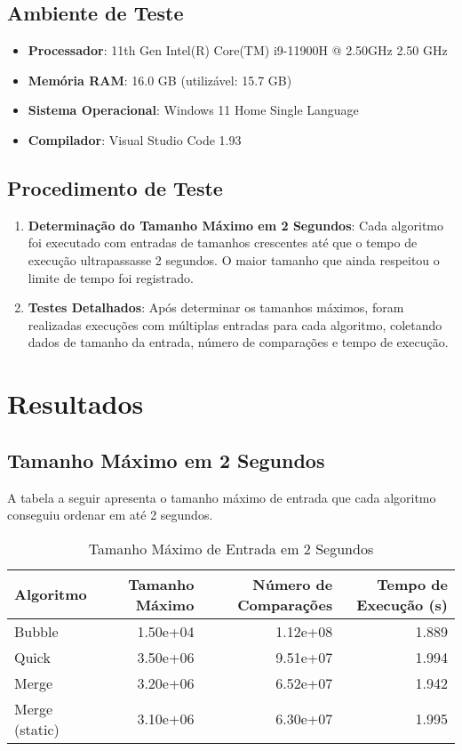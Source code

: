 \documentclass[a4paper,12pt]{article}
\begin{document}
\subsection{Ambiente de Teste}

\begin{itemize}
    \item \textbf{Processador}: 11th Gen Intel(R) Core(TM) i9-11900H @ 2.50GHz   2.50 GHz
    \item \textbf{Memória RAM}: 16.0 GB (utilizável: 15.7 GB)
    \item \textbf{Sistema Operacional}: Windows 11 Home Single Language
    \item \textbf{Compilador}: Visual Studio Code 1.93
\end{itemize}

\subsection{Procedimento de Teste}

\begin{enumerate}
    \item \textbf{Determinação do Tamanho Máximo em 2 Segundos}: Cada algoritmo foi executado com entradas de tamanhos crescentes até que o tempo de execução ultrapassasse 2 segundos. O maior tamanho que ainda respeitou o limite de tempo foi registrado.
    \item \textbf{Testes Detalhados}: Após determinar os tamanhos máximos, foram realizadas execuções com múltiplas entradas para cada algoritmo, coletando dados de tamanho da entrada, número de comparações e tempo de execução.
\end{enumerate}

\section{Resultados}

\subsection{Tamanho Máximo em 2 Segundos}

A tabela a seguir apresenta o tamanho máximo de entrada que cada algoritmo conseguiu ordenar em até 2 segundos.

\begin{table}[H]
    \centering
    \caption{Tamanho Máximo de Entrada em 2 Segundos}
    \label{tab:tamanho_maximo}
    \begin{tabular}{lrrr}
    \toprule
    Algoritmo & Tamanho Máximo & Número de Comparações & Tempo de Execução (s) \\
    \midrule
    Bubble & 1.50e+04 & 1.12e+08 & 1.889 \\
    Quick & 3.50e+06 & 9.51e+07 & 1.994 \\
    Merge & 3.20e+06 & 6.52e+07 & 1.942 \\
    Merge (static) & 3.10e+06 & 6.30e+07 & 1.995 \\
    \bottomrule
    \end{tabular}
\end{table}
\end{document}
